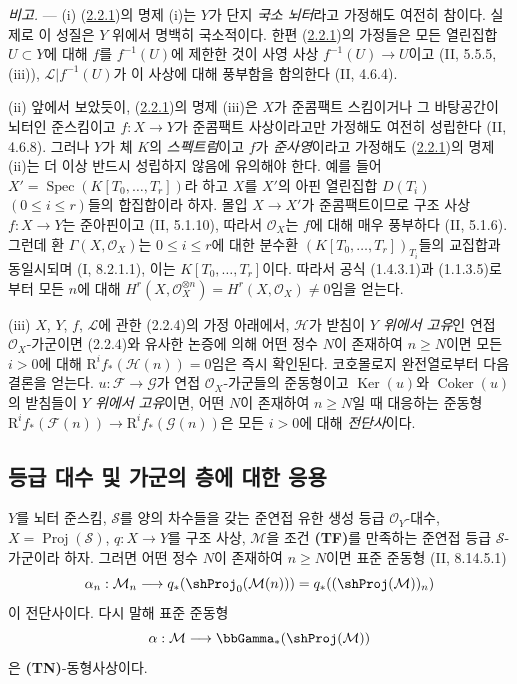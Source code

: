 \begin{env}[2.2.5]
\label{III.2.2.5-fr}
\emph{비고.} ---
(i) (\hyperref[III.2.2.1-fr]{2.2.1})의 명제 (i)는 $Y$가 단지
\emph{국소 뇌터}라고 가정해도 여전히 참이다. 실제로 이 성질은
$Y$ 위에서 명백히 국소적이다. 한편
(\hyperref[III.2.2.1-fr]{2.2.1})의 가정들은 모든 열린집합
$U\subset Y$에 대해 $f$를 $f^{-1}(U)$에 제한한 것이 사영 사상
$f^{-1}(U)\to U$이고 (II, 5.5.5, (iii)),
$\mathcal L|f^{-1}(U)$가 이 사상에 대해 풍부함을 함의한다
(II, 4.6.4).

(ii) 앞에서 보았듯이, (\hyperref[III.2.2.1-fr]{2.2.1})의 명제 (iii)은
$X$가 준콤팩트 스킴이거나 그 바탕공간이 뇌터인 준스킴이고
$f:X\to Y$가 준콤팩트 사상이라고만 가정해도 여전히 성립한다
(II, 4.6.8). 그러나 $Y$가 체 $K$의 \emph{스펙트럼}이고 $f$가
\emph{준사영}이라고 가정해도
(\hyperref[III.2.2.1-fr]{2.2.1})의 명제 (ii)는 더 이상 반드시
성립하지 않음에 유의해야 한다. 예를 들어
$X'=\operatorname{Spec}(K[T_0,\ldots,T_r])$라 하고 $X$를 $X'$의 아핀
열린집합 $D(T_i)$ $(0\leq i\leq r)$들의 합집합이라 하자.
몰입 $X\to X'$가 준콤팩트이므로 구조 사상 $f:X\to Y$는 준아핀이고
(II, 5.1.10), 따라서 $\mathcal O_X$는 $f$에 대해 매우 풍부하다
(II, 5.1.6). 그런데 환 $\Gamma(X,\mathcal O_X)$는
$0\leq i\leq r$에 대한 분수환
$(K[T_0,\ldots,T_r])_{T_i}$들의 교집합과 동일시되며
(I, 8.2.1.1), 이는 $K[T_0,\ldots,T_r]$이다. 따라서 공식 (1.4.3.1)과
(1.1.3.5)로부터 모든 $n$에 대해
$H^r(X,\mathcal O_X^{\otimes n})=H^r(X,\mathcal O_X)\neq0$임을 얻는다.

(iii) $X$, $Y$, $f$, $\mathcal L$에 관한 (2.2.4)의 가정 아래에서,
$\mathcal H$가 받침이 \emph{$Y$ 위에서 고유}인 연접
$\mathcal O_X$-가군이면 (2.2.4)와 유사한 논증에 의해 어떤 정수 $N$이
존재하여 $n\geq N$이면 모든 $i>0$에 대해
$\mathrm R^if_*(\mathcal H(n))=0$임은 즉시 확인된다. 코호몰로지
완전열로부터 다음 결론을 얻는다. $u:\mathcal F\to\mathcal G$가 연접
$\mathcal O_X$-가군들의 준동형이고 $\operatorname{Ker}(u)$와
$\operatorname{Coker}(u)$의 받침들이 \emph{$Y$ 위에서 고유}이면,
어떤 $N$이 존재하여 $n\geq N$일 때 대응하는 준동형
$\mathrm R^if_*(\mathcal F(n))\to\mathrm R^if_*(\mathcal G(n))$은
모든 $i>0$에 대해 \emph{전단사}이다.
\end{env}

\subsection{등급 대수 및 가군의 층에 대한 응용}
\label{subsection:III.2.3-fr}

\begin{theorem}[2.3.1]
\label{III.2.3.1-fr}
$Y$를 뇌터 준스킴, $\mathcal S$를 양의 차수들을 갖는 준연접 유한 생성
등급 $\mathcal O_Y$-대수, $X=\operatorname{Proj}(\mathcal S)$,
$q:X\to Y$를 구조 사상, $\mathcal M$을 조건 \textbf{(TF)}를 만족하는
준연접 등급 $\mathcal S$-가군이라 하자. 그러면 어떤 정수 $N$이
존재하여 $n\geq N$이면 표준 준동형 (II, 8.14.5.1)
\[
\alpha_n:\mathcal M_n\longrightarrow
q_*(\shProj_0(\mathcal M(n)))
=q_*((\shProj(\mathcal M))_n)
\]
이 전단사이다. 다시 말해 표준 준동형
\[
\alpha:\mathcal M\longrightarrow\bbGamma_*(\shProj(\mathcal M))
\]
은 \textbf{(TN)}-동형사상이다.
\end{theorem}

